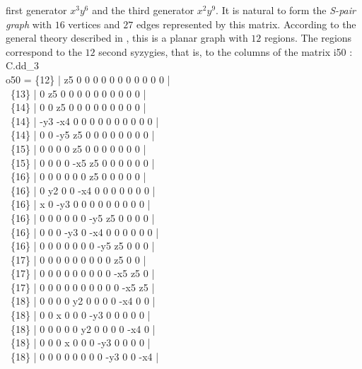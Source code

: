 first generator $x^3 y^6 $ and the third generator $x^2 y^9$.
It is natural to form the {\it S-pair graph} with $16$ vertices and
$27$ edges represented by  this matrix. According to the
general theory described in \cite{MS}, this is a planar graph
with $12$ regions. The regions correspond to the $12$ second syzygies,
that is, to the columns of the matrix
\beginOutput
i50 : C.dd_3\\
\emptyLine
o50 = \{12\} | z5  0   0   0   0   0   0   0   0   0   0   0   |\\
\      \{13\} | 0   z5  0   0   0   0   0   0   0   0   0   0   |\\
\      \{14\} | 0   0   z5  0   0   0   0   0   0   0   0   0   |\\
\      \{14\} | -y3 -x4 0   0   0   0   0   0   0   0   0   0   |\\
\      \{14\} | 0   0   -y5 z5  0   0   0   0   0   0   0   0   |\\
\      \{15\} | 0   0   0   0   z5  0   0   0   0   0   0   0   |\\
\      \{15\} | 0   0   0   0   -x5 z5  0   0   0   0   0   0   |\\
\      \{16\} | 0   0   0   0   0   0   z5  0   0   0   0   0   |\\
\      \{16\} | 0   y2  0   0   -x4 0   0   0   0   0   0   0   |\\
\      \{16\} | x   0   -y3 0   0   0   0   0   0   0   0   0   |\\
\      \{16\} | 0   0   0   0   0   0   -y5 z5  0   0   0   0   |\\
\      \{16\} | 0   0   0   -y3 0   -x4 0   0   0   0   0   0   |\\
\      \{16\} | 0   0   0   0   0   0   0   -y5 z5  0   0   0   |\\
\      \{17\} | 0   0   0   0   0   0   0   0   0   z5  0   0   |\\
\      \{17\} | 0   0   0   0   0   0   0   0   0   -x5 z5  0   |\\
\      \{17\} | 0   0   0   0   0   0   0   0   0   0   -x5 z5  |\\
\      \{18\} | 0   0   0   0   y2  0   0   0   0   -x4 0   0   |\\
\      \{18\} | 0   0   x   0   0   0   -y3 0   0   0   0   0   |\\
\      \{18\} | 0   0   0   0   0   y2  0   0   0   0   -x4 0   |\\
\      \{18\} | 0   0   0   x   0   0   0   -y3 0   0   0   0   |\\
\      \{18\} | 0   0   0   0   0   0   0   0   -y3 0   0   -x4 |\\
